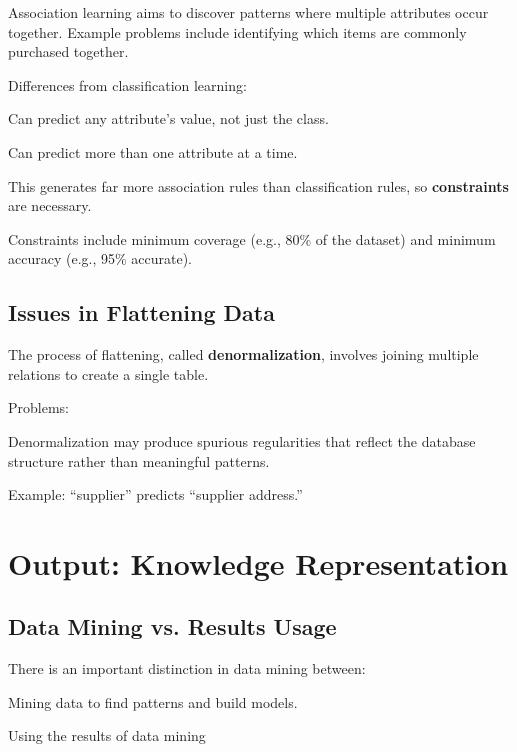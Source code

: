 Association learning aims to discover patterns where multiple attributes occur together. Example problems include identifying which items are commonly purchased together.  

Differences from classification learning:  
\begin{compactitemize}
    \item Can predict any attribute’s value, not just the class.  
    \item Can predict more than one attribute at a time.  
    \item This generates far more association rules than classification rules, so \textbf{constraints} are necessary.  
    \item Constraints include minimum coverage (e.g., 80\% of the dataset) and minimum accuracy (e.g., 95\% accurate).  
\end{compactitemize}


\subsection{Issues in Flattening Data}

The process of flattening, called \textbf{denormalization}, involves joining multiple relations to create a single table.  

Problems:  
\begin{compactitemize}
    \item Denormalization may produce spurious regularities that reflect the database structure rather than meaningful patterns.  
    \item Example: ``supplier'' predicts ``supplier address.''  
\end{compactitemize}




\newpage
\section{Output: Knowledge Representation}

\subsection{Data Mining vs. Results Usage}

    There is an important distinction in data mining between:
    \begin{compactitemize}
        \item Mining data to find patterns and build models.
        \item Using the results of data mining
    \end{compactitemize}


